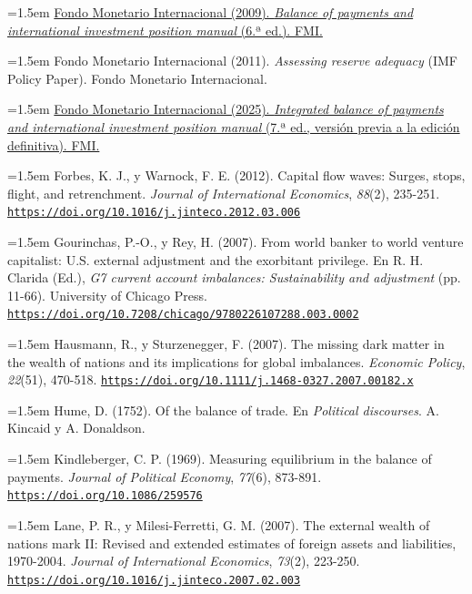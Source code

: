 \documentclass[10pt,a4paper]{article}
\begin{document}
\noindent\hangindent=1.5em \href{https://www.imf.org/external/pubs/ft/bop/2007/pdf/bpm6.pdf}{Fondo Monetario Internacional (2009). \textit{Balance of payments and international investment position manual} (6.ª ed.). FMI.}

\noindent\hangindent=1.5em Fondo Monetario Internacional (2011). \textit{Assessing reserve adequacy} (IMF Policy Paper). Fondo Monetario Internacional.

\noindent\hangindent=1.5em \href{https://www.imf.org/en/Data/Statistics/BPM}{Fondo Monetario Internacional (2025). \textit{Integrated balance of payments and international investment position manual} (7.ª ed., versión previa a la edición definitiva). FMI.}

\noindent\hangindent=1.5em Forbes, K. J., y Warnock, F. E. (2012). Capital flow waves: Surges, stops, flight, and retrenchment. \textit{Journal of International Economics}, \textit{88}(2), 235-251. \href{https://doi.org/10.1016/j.jinteco.2012.03.006}{\nolinkurl{https://doi.org/10.1016/j.jinteco.2012.03.006}}

\noindent\hangindent=1.5em Gourinchas, P.-O., y Rey, H. (2007). From world banker to world venture capitalist: U.S. external adjustment and the exorbitant privilege. En R. H. Clarida (Ed.), \textit{G7 current account imbalances: Sustainability and adjustment} (pp. 11-66). University of Chicago Press. \href{https://doi.org/10.7208/chicago/9780226107288.003.0002}{\nolinkurl{https://doi.org/10.7208/chicago/9780226107288.003.0002}}

\noindent\hangindent=1.5em Hausmann, R., y Sturzenegger, F. (2007). The missing dark matter in the wealth of nations and its implications for global imbalances. \textit{Economic Policy}, \textit{22}(51), 470-518. \href{https://doi.org/10.1111/j.1468-0327.2007.00182.x}{\nolinkurl{https://doi.org/10.1111/j.1468-0327.2007.00182.x}}

\noindent\hangindent=1.5em Hume, D. (1752). Of the balance of trade. En \textit{Political discourses}. A. Kincaid y A. Donaldson.

\noindent\hangindent=1.5em Kindleberger, C. P. (1969). Measuring equilibrium in the balance of payments. \textit{Journal of Political Economy}, \textit{77}(6), 873-891. \href{https://doi.org/10.1086/259576}{\nolinkurl{https://doi.org/10.1086/259576}}

\noindent\hangindent=1.5em Lane, P. R., y Milesi-Ferretti, G. M. (2007). The external wealth of nations mark II: Revised and extended estimates of foreign assets and liabilities, 1970-2004. \textit{Journal of International Economics}, \textit{73}(2), 223-250. \href{https://doi.org/10.1016/j.jinteco.2007.02.003}{\nolinkurl{https://doi.org/10.1016/j.jinteco.2007.02.003}}
\end{document}
